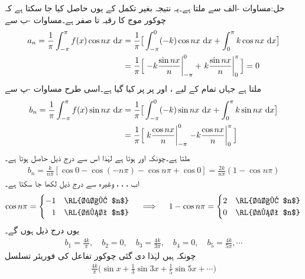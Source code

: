 حل:مساوات -الف سے  ملتا ہے۔یہ نتیجہ بغیر تکمل کے یوں حاصل کیا جا سکتا ہے کہ چوکور موج کا رقبہ  تا  صفر ہے۔مساوات -ب سے
\begin{align*}
a_n=\frac{1}{\pi}\int_{-\pi}^{\pi}f(x)\cos nx\, \dif x&=\frac{1}{\pi}\big[\int_{-\pi}^{0}(-k)\cos nx\,\dif x+\int_{0}^{\pi}k\cos nx\,\dif x\big]\\
&=\frac{1}{\pi}\Big[\left. -k\frac{\sin nx}{n}\right|_{-\pi}^{0}+\left. k\frac{\sin nx}{n}\right|_{0}^{\pi}\Big]=0
\end{align*}
ملتا ہے جہاں تمام  کے لیے ،  اور  پر   پر کیا گیا ہے۔اسی طرح مساوات -پ سے
\begin{align*}
b_n=\frac{1}{\pi}\int_{-\pi}^{\pi}f(x)\sin nx\, \dif x&=\frac{1}{\pi}\big[\int_{-\pi}^{0}(-k)\sin nx\,\dif x+\int_{0}^{\pi}k\sin nx\,\dif x\big]\\
&=\frac{1}{\pi}\Big[\left. k\frac{\cos nx}{n}\right|_{-\pi}^{0}\left. -k\frac{\cos nx}{n}\right|_{0}^{\pi}\Big]
\end{align*}
ملتا ہے۔چونکہ  اور  ہوتا ہے لہٰذا اس سے درج ذیل حاصل ہوتا ہے۔
\begin{align*}
b_n=\frac{k}{n\pi}[\cos 0-\cos(-n\pi)-\cos n\pi +\cos 0]=\frac{2k}{n\pi}(1-\cos n\pi)
\end{align*}
اب ، ، ، وغیرہ سے درج ذیل لکھا جا سکتا ہے۔
\begin{align*}
\cos n\pi=
\begin{cases}
-1& \text{\RL{طاق $n$}}\\
\phantom{-}1&\text{\RL{جفت $n$}}
\end{cases}
\quad \implies \quad
1-\cos n\pi=
\begin{cases}
2&\text{\RL{طاق $n$}}\\
0&\text{\RL{جفت $n$}}
\end{cases}
\end{align*}
یوں  درج ذیل ہوں گے۔
\begin{align*}
b_1=\frac{4k}{\pi},\quad  b_2=0,\quad  b_3=\frac{4k}{3\pi},\quad b_4=0,\quad  b_5=\frac{4k}{5\pi}, \cdots
\end{align*}
چونکہ  ہیں لہٰذا دی گئی چوکور تفاعل کی فوریئر تسلسل
\begin{align}
\frac{4k}{\pi}\big(\sin x+\frac{1}{3}\sin 3x+\frac{1}{5}\sin 5x+\cdots \big)
\end{align}
